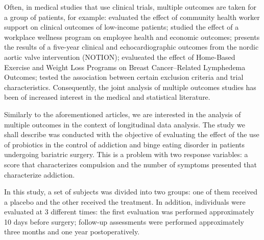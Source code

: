 \documentclass[AMA,STIX1COL]{WileyNJD-v2}
\begin{document}

Often, in medical studies that use clinical trials, multiple outcomes are taken for a group of patients, for example: \cite{kangovi2018effect} evaluated the effect of community health worker support on clinical outcomes of low-income patients; \cite{song2019effect} studied the effect of a workplace wellness program on employee health and economic outcomes; \cite{thyregod2019five} presents the results of a five-year clinical and echocardiographic outcomes from the nordic aortic valve intervention (NOTION); \cite{schmitz2019effect} evalueated the effect of Home-Based Exercise and Weight Loss Programs on Breast Cancer–Related Lymphedema Outcomes; \cite{duma2019characterization} tested the association between certain exclusion criteria and trial characteristics. Consequently, the joint analysis of multiple outcomes studies has been of increased interest in the medical and statistical literature. 


Similarly to the aforementioned articles, we are interested in the analysis of multiple outcomes in the context of longitudinal data analysis. The study we shall describe was conducted with the objective of evaluating the effect of the use of probiotics in the control of addiction and binge eating disorder in patients undergoing bariatric surgery. This is a problem with two response variables: a score that characterizes compulsion and the number of symptoms presented that characterize addiction. 

In this study, a set of subjects was divided into two groups: one of them received a placebo and the other received the treatment. In addition, individuals were evaluated at 3 different times: the first evaluation was performed approximately 10 days before surgery; follow-up assessments were performed approximately three months and one year postoperatively.

\end{document}
